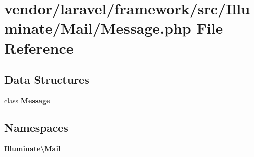 \section{vendor/laravel/framework/src/\+Illuminate/\+Mail/\+Message.php File Reference}
\label{laravel_2framework_2src_2_illuminate_2_mail_2_message_8php}
\subsection*{Data Structures}
\begin{DoxyCompactItemize}
\item 
class {\bf Message}
\end{DoxyCompactItemize}
\subsection*{Namespaces}
\begin{DoxyCompactItemize}
\item 
 {\bf Illuminate\textbackslash{}\+Mail}
\end{DoxyCompactItemize}
